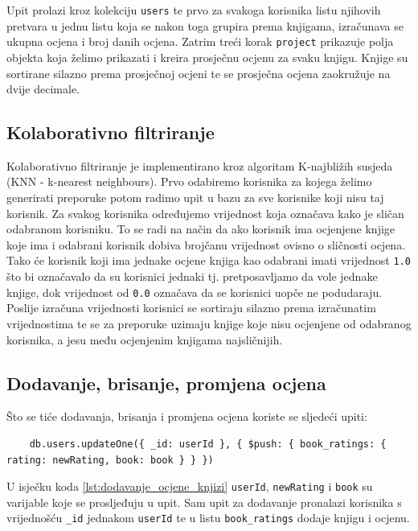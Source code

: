 \documentclass[]{foi}
\begin{document}
Upit prolazi kroz kolekciju \texttt{users} te prvo za svakoga korisnika listu njihovih pretvara u jednu listu koja se nakon toga
grupira prema knjigama, izračunava se ukupna ocjena i broj danih ocjena. Zatrim treći korak \texttt{project} prikazuje polja
objekta koja želimo prikazati i kreira prosječnu ocjenu za svaku knjigu. Knjige su sortirane silazno prema prosječnoj ocjeni
te se prosječna ocjena zaokružuje na dvije decimale.

\subsection{Kolaborativno filtriranje}

Kolaborativno filtriranje je implementirano kroz algoritam K-najbližih susjeda (KNN - k-nearest neighbours).
Prvo odabiremo korisnika za kojega želimo generirati preporuke potom radimo upit u bazu za sve korisnike koji nisu taj korisnik.
Za svakog korisnika određujemo vrijednost koja označava kako je sličan odabranom korisniku.
To se radi na način da ako korisnik ima ocjenjene knjige koje ima i odabrani korisnik dobiva brojčanu vrijednost ovisno o
sličnosti ocjena. Tako će korisnik koji ima jednake ocjene knjiga kao odabrani imati vrijednost \texttt{1.0} što bi označavalo
da su korisnici jednaki tj. pretposavljamo da vole jednake knjige, dok vrijednost od \texttt{0.0} označava da se korisnici uopče
ne podudaraju. Poslije izračuna vrijednosti korisnici se sortiraju silazno prema izračunatim vrijednostima te se za preporuke
uzimaju knjige koje nisu ocjenjene od odabranog korisnika, a jesu među ocjenjenim knjigama najsličnijih.

\subsection{Dodavanje, brisanje, promjena ocjena}

Što se tiće dodavanja, brisanja i promjena ocjena koriste se sljedeći upiti:
\begin{verbatim}
    db.users.updateOne({ _id: userId }, { $push: { book_ratings: { rating: newRating, book: book } } })
\end{verbatim}
\label{lst:dodavanje_ocjene_knjizi}

U isječku koda \ref{lst:dodavanje_ocjene_knjizi} \texttt{userId}, \texttt{newRating} i \texttt{book} su varijable koje
se prosljeđuju u upit. Sam upit za dodavanje pronalazi korisnika s vrijednošću \texttt{\_id} jednakom \texttt{userId} te u
listu \texttt{book\_ratings} dodaje knjigu i ocjenu.
\end{document}
